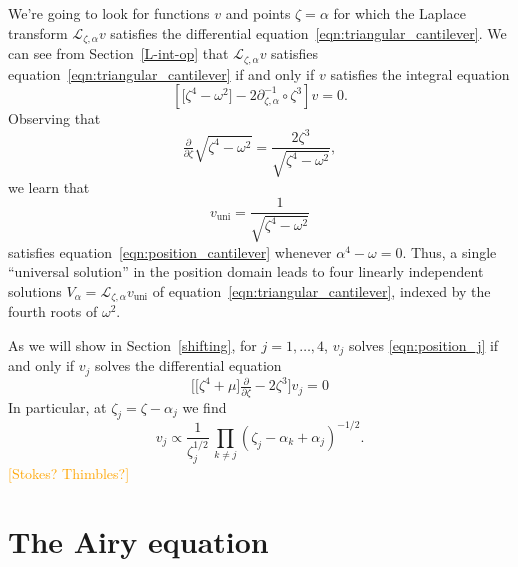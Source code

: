 \documentclass{article}
\newcommand{\fracderiv}[3]{\partial^{#1}_{#2, #3}}
\newcommand{\laplace}{\mathcal{L}}
\theoremstyle{definition}
\theoremstyle{plain}
\begin{document}
\color{black}
We're going to look for functions $v$ and points $\zeta = \alpha$ for which the Laplace transform $\laplace_{\zeta, \alpha} v$ satisfies the differential equation~\eqref{eqn:triangular_cantilever}. We can see from Section~\ref{L-int-op} that $\laplace_{\zeta, \alpha} v$ satisfies equation~\eqref{eqn:triangular_cantilever} if and only if $v$ satisfies the integral equation
\begin{equation}\label{eqn:position_cantilever}
    \left[ \big[ \zeta^4 - \omega^2 \big] - 2\fracderiv{-1}{\zeta}{\alpha} \circ \zeta^3 \right] v = 0.
\end{equation}
Observing that
\[ \tfrac{\partial}{\partial \zeta} \sqrt{\zeta^4 - \omega^2} = \frac{2\zeta^3}{\sqrt{\zeta^4 - \omega^2}}, \]
we learn that
\[ v_\text{uni} = \frac{1}{\sqrt{\zeta^4 - \omega^2}} \]
satisfies equation~\eqref{eqn:position_cantilever} whenever $\alpha^4 - \omega = 0$. Thus, a single ``universal solution'' in the position domain leads to four linearly independent solutions $V_\alpha = \laplace_{\zeta, \alpha} v_\text{uni}$ of equation~\eqref{eqn:triangular_cantilever}, indexed by the fourth roots of $\omega^2$.
\par\color{RoyalBlue}
As we will show in Section~\ref{shifting}, for $j=1,\ldots,4$, $v_j$ solves \eqref{eqn:position_j} if and only if $v_j$ solves the differential equation 
\begin{equation}
    \Big[\big[\zeta^4+\mu\big]\tfrac{\partial}{\partial\zeta}-2\zeta^3\Big]v_j = 0
\end{equation}
In particular, at $\zeta_j=\zeta-\alpha_j$ we find 
\[v_j \propto \frac{1}{\zeta_j^{1/2}}\, \prod_{k\neq j}(\zeta_j-\alpha_k+\alpha_j)^{-1/2}.\]
\color{black}
\textcolor{orange}{[Stokes? Thimbles?]}

\appendix

\section{The Airy equation}\label{airy-appendix}
\end{document}

